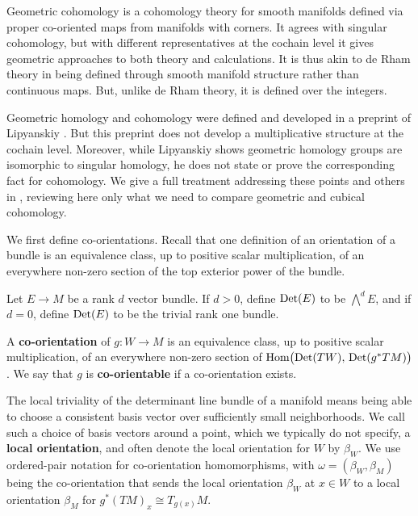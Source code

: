 Geometric cohomology is a cohomology theory for smooth manifolds defined via proper co-oriented maps from manifolds with corners.
It agrees with singular cohomology, but with different representatives at the cochain level it gives geometric approaches to both theory and calculations.
It is thus akin to de Rham theory in being defined through smooth manifold structure rather than continuous maps.
But, unlike de Rham theory, it is defined over the integers.

Geometric homology and cohomology were defined and developed in a preprint of Lipyanskiy \cite{Lipy14}.
But this preprint does not develop a multiplicative structure at the cochain level.
Moreover, while Lipyanskiy shows geometric homology groups are isomorphic to singular homology, he does not state or prove the corresponding fact for cohomology.
We give a full treatment addressing these points and others in \cite{medina2022foundations}, reviewing here only what we need to compare geometric and cubical cohomology.

We first define co-orientations.
Recall that one definition of an orientation of a bundle is an equivalence class, up to positive scalar multiplication, of an everywhere non-zero section of the top exterior power of the bundle.

\begin{definition}\label{D:co-orientations}
	Let $E \to M$ be a rank $d$ vector bundle.
	If $d > 0$, define ${\rm Det}(E)$ to be $\bigwedge^d E$, and if $d = 0$, define ${\rm Det}(E)$ to be the trivial rank one bundle.

	A \textbf{co-orientation} of $g \colon W \to M$ is an equivalence class, up to positive scalar multiplication, of an everywhere non-zero section of $\textup{Hom} \big( {\rm Det}(TW),\, {\rm Det}(g^*TM) \big)$.
	We say that $g$ is \textbf{co-orientable} if a co-orientation exists.
\end{definition}

The local triviality of the determinant line bundle of a manifold means being able to choose a consistent basis vector over sufficiently small neighborhoods.
We call such a choice of basis vectors around a point, which we typically do not specify, a \textbf{local orientation}, and often denote the local orientation for $W$ by $\beta_W$.
We use ordered-pair notation for co-orientation homomorphisms, with $\omega = (\beta_W, \beta_M)$ being the co-orientation that sends the local orientation $\beta_W$ at $x\in W$ to a local orientation $\beta_M$ for $g^*(TM)_x\cong T_{g(x)}M$.

